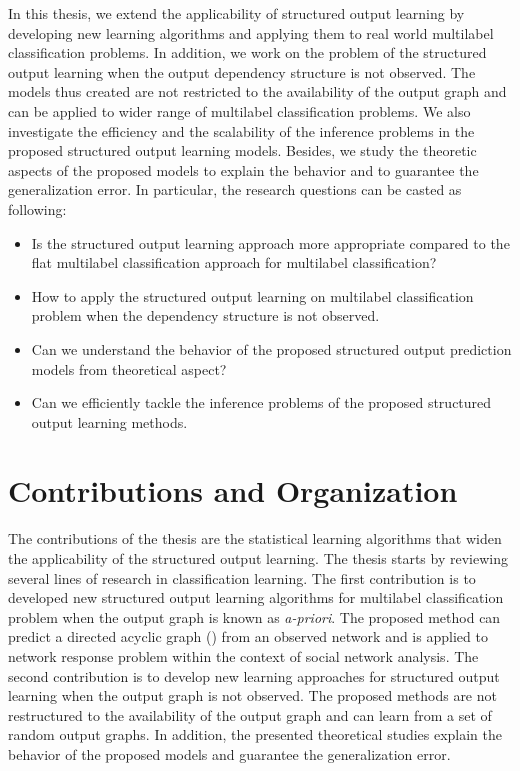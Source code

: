 In this thesis, we extend the applicability of structured output learning by developing new learning algorithms and applying them to real world multilabel classification problems.
In addition, we work on the problem of the structured output learning when the output dependency structure is not observed.
The models thus created are not restricted to the availability of the output graph and can be applied to wider range of multilabel classification problems.
We also investigate the efficiency and the scalability of the inference problems in the proposed structured output learning models.
Besides, we study the theoretic aspects of the proposed models to explain the behavior and to guarantee the generalization error.
In particular, the research questions can be casted as following:
\begin{itemize}
	
\item Is the structured output learning approach more appropriate compared to the flat multilabel classification approach for multilabel classification?

\item How to apply the structured output learning on multilabel classification problem when the dependency structure is not observed.

\item Can we understand the behavior of the proposed structured output prediction models from theoretical aspect? 

\item Can we efficiently tackle the inference problems of the proposed structured output learning methods.

\end{itemize}



%
%
\section{Contributions and Organization}

The contributions of the thesis are the statistical learning algorithms that widen the applicability of the structured output learning.
The thesis starts by reviewing several lines of research in classification learning.
The first contribution is to developed new structured output learning algorithms for multilabel classification problem when the output graph is known as \textit{a-priori}.
The proposed method can predict a directed acyclic graph (\daggraph) from an observed network and is applied to network response problem within the context of social network analysis.
The second contribution is to develop new learning approaches for structured output learning when the output graph is not observed.
The proposed methods are not restructured to the availability of the output graph and can learn from a set of random output graphs.
In addition, the presented theoretical studies explain the behavior of the proposed models and guarantee the generalization error.

